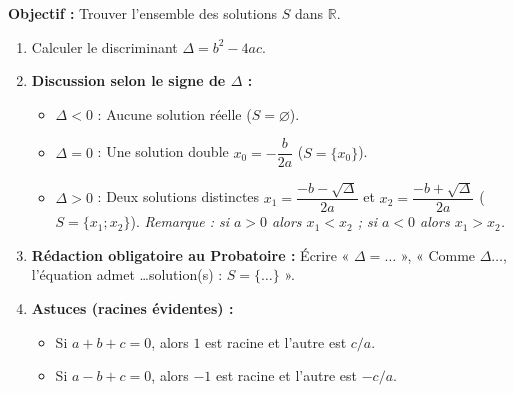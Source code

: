 \documentclass[11pt]{article}
\begin{document}
\begin{methode}[Résoudre une équation du second degré $ax^2+bx+c=0$]
    \textbf{Objectif :} Trouver l'ensemble des solutions $S$ dans $\mathbb{R}$.
    \begin{enumerate}
        \item Calculer le discriminant $\Delta = b^2 - 4ac$.
        \item \textbf{Discussion selon le signe de $\Delta$ :}
        \begin{itemize}
            \item $\Delta < 0$ : Aucune solution réelle ($S = \varnothing$).
            \item $\Delta = 0$ : Une solution double $x_0 = -\dfrac{b}{2a}$ ($S = \{x_0\}$).
            \item $\Delta > 0$ : Deux solutions distinctes 
            $x_1 = \dfrac{-b-\sqrt{\Delta}}{2a}$ et $x_2 = \dfrac{-b+\sqrt{\Delta}}{2a}$ ($S = \{x_1; x_2\}$).
            \emph{Remarque : si $a>0$ alors $x_1 < x_2$ ; si $a<0$ alors $x_1 > x_2$.}
        \end{itemize}
        \item \textbf{Rédaction obligatoire au Probatoire :} Écrire « $\Delta = \dots$ », « Comme $\Delta \dots$, l'équation admet \dots solution(s) : $S = \{\dots\}$ ».
        \item \textbf{Astuces (racines évidentes) :} 
        \begin{itemize}
            \item Si $a+b+c=0$, alors $1$ est racine et l'autre est $c/a$.
            \item Si $a-b+c=0$, alors $-1$ est racine et l'autre est $-c/a$.
        \end{itemize}
    \end{enumerate}
\end{methode}
\end{document}
